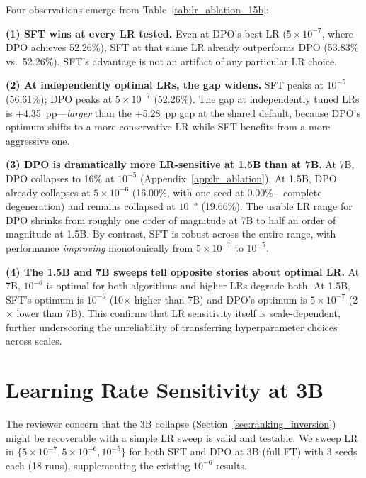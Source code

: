\documentclass{article}
\begin{document}
Four observations emerge from Table~\ref{tab:lr_ablation_15b}:

\textbf{(1) SFT wins at every LR tested.} Even at DPO's best LR ($5{\times}10^{-7}$, where DPO achieves 52.26\%), SFT at that same LR already outperforms DPO (53.83\% vs.\ 52.26\%). SFT's advantage is not an artifact of any particular LR choice.

\textbf{(2) At independently optimal LRs, the gap widens.} SFT peaks at $10^{-5}$ (56.61\%); DPO peaks at $5{\times}10^{-7}$ (52.26\%). The gap at independently tuned LRs is +4.35~pp---\emph{larger} than the +5.28~pp gap at the shared default, because DPO's optimum shifts to a more conservative LR while SFT benefits from a more aggressive one.

\textbf{(3) DPO is dramatically more LR-sensitive at 1.5B than at 7B.} At 7B, DPO collapses to 16\% at $10^{-5}$ (Appendix~\ref{app:lr_ablation}). At 1.5B, DPO already collapses at $5{\times}10^{-6}$ (16.00\%, with one seed at 0.00\%---complete degeneration) and remains collapsed at $10^{-5}$ (19.66\%). The usable LR range for DPO shrinks from roughly one order of magnitude at 7B to half an order of magnitude at 1.5B. By contrast, SFT is robust across the entire range, with performance \emph{improving} monotonically from $5{\times}10^{-7}$ to $10^{-5}$.

\textbf{(4) The 1.5B and 7B sweeps tell opposite stories about optimal LR.} At 7B, $10^{-6}$ is optimal for both algorithms and higher LRs degrade both. At 1.5B, SFT's optimum is $10^{-5}$ (10$\times$ higher than 7B) and DPO's optimum is $5{\times}10^{-7}$ (2$\times$ lower than 7B). This confirms that LR sensitivity itself is scale-dependent, further underscoring the unreliability of transferring hyperparameter choices across scales.

\section{Learning Rate Sensitivity at 3B}
\label{app:lr_ablation_3b}

The reviewer concern that the 3B collapse (Section~\ref{sec:ranking_inversion}) might be recoverable with a simple LR sweep is valid and testable. We sweep LR in $\{5{\times}10^{-7}, 5{\times}10^{-6}, 10^{-5}\}$ for both SFT and DPO at 3B (full FT) with 3 seeds each (18 runs), supplementing the existing $10^{-6}$ results.
\end{document}
